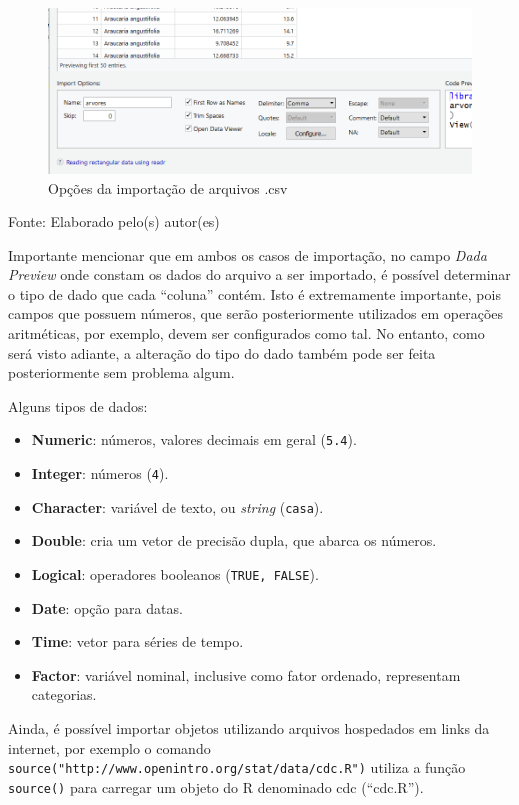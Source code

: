 \documentclass[12pt,brazil,oneside]{book}
\providecommand{\tightlist}{%
  \setlength{\itemsep}{0pt}\setlength{\parskip}{0pt}}
\begin{document}
\begin{figure}[H]

{\centering \includegraphics[width=0.8\linewidth]{r4csv} 

}

\caption{Opções da importação de arquivos .csv}\label{fig:r4csv}
\end{figure}

Fonte: Elaborado pelo(s) autor(es)

Importante mencionar que em ambos os casos de importação, no campo \emph{Dada Preview} onde constam os dados do arquivo a ser importado, é possível determinar o tipo de dado que cada ``coluna'' contém. Isto é extremamente importante, pois campos que possuem números, que serão posteriormente utilizados em operações aritméticas, por exemplo, devem ser configurados como tal. No entanto, como será visto adiante, a alteração do tipo do dado também pode ser feita posteriormente sem problema algum.

Alguns tipos de dados:

\begin{itemize}
\tightlist
\item
  \textbf{Numeric}: números, valores decimais em geral (\texttt{5.4}).
\item
  \textbf{Integer}: números (\texttt{4}).
\item
  \textbf{Character}: variável de texto, ou \emph{string} (\texttt{casa}).
\item
  \textbf{Double}: cria um vetor de precisão dupla, que abarca os números.
\item
  \textbf{Logical}: operadores booleanos (\texttt{TRUE,\ FALSE}).
\item
  \textbf{Date}: opção para datas.
\item
  \textbf{Time}: vetor para séries de tempo.
\item
  \textbf{Factor}: variável nominal, inclusive como fator ordenado, representam categorias.
\end{itemize}

Ainda, é possível importar objetos utilizando arquivos hospedados em links da internet, por exemplo o comando \texttt{source("http://www.openintro.org/stat/data/cdc.R")} utiliza a função \texttt{source()} para carregar um objeto do R denominado cdc (``cdc.R'').
\end{document}
